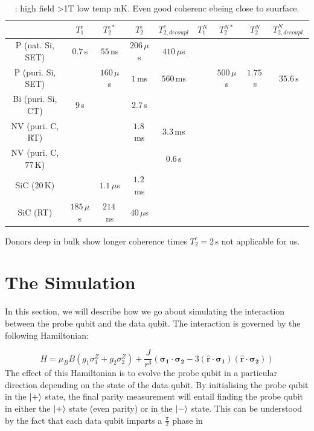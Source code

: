 \begin{table}
\begin{tabular}{ccccccccc}
	& $T_1^e$ & $T_2^{e*}$ & $T_2^e$ & $T_{2, decoupl}^e$ & $T_1^N$ & $T_2^{N*}$ & $T_2^N$ & $T_{2, decoupl.}^N$\\ \hline
P (nat. Si, SET) \cite{Pla2012}& $0.7\, $s & $55\, $ns  & $206\, \mu$s & $410\, \mu$s &  & & \\
P (puri. Si, SET) \cite{Muhonen2014}&  & $160\, \mu$s  & $1\, $ms & $560\, $ms & & $500\, \mu$s & $1.75\, $s & $35.6\, $s \\
Bi (puri. Si, CT) \cite{Wolfowicz2013} & $9\, $s &  & $2.7\, $s && && &\\
NV (puri. C, RT) \cite{Balasubramanian2009,Bar-Gill2013} & & & $1.8\, $ms & $3.3\, $ms && &&\\
NV (puri. C, $77\, $K) \cite{Bar-Gill2013} & & &  & $0.6\, $s && &&\\
SiC ($20\, $K) \cite{Christle2014} & & $1.1\, \mu$s & $1.2\, $ms & && && \\
SiC (RT) \cite{Koehl2011} & $185\, \mu$s & $214\, $ns & $40\, \mu$s &  & & && \\
\hline
\end{tabular} 
\label{lala}
\caption{\cite{Pla2012,Muhonen2014}: high field >1T low temp mK. Even good coherenc ebeing close to suurface.}
\end{table}

Donors deep in bulk show longer coherence times $T_2^e=2\, $s \cite{Tyryshkin2011} not applicable for us.


\section{The Simulation}
In this section, we will describe how we go about simulating the interaction between the probe qubit and the data qubit. The interaction is governed by the following Hamiltonian:

\begin{equation}
H = \mu_B B( g_1 \sigma_1^Z + g_2 \sigma_2^Z) + \frac{J}{r^3} ( \mathbf{\sigma_1} \cdot \mathbf{\sigma_2} - 3 ( \hat{\mathbf{r}} \cdot \mathbf{\sigma_1}) ( \hat{\mathbf{r}}\cdot \mathbf{\sigma_2}))
\end{equation}
The effect of this Hamiltonian is to evolve the probe qubit in a particular direction depending on the state of the data qubit. By initialising the probe qubit in the $\ket{+}$ state, the final parity measurement will entail finding the probe qubit in either the $\ket{+}$ state (even parity) or in the $\ket{-}$ state. This can be understood by the fact that each data qubit imparts a $\frac{\pi}{2}$ phase in 

